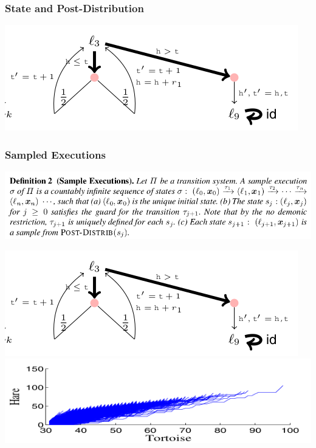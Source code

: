 \documentclass[11pt]{beamer}
\begin{document}
\begin{frame}\frametitle{State and Post-Distribution}

\begin{center}
\includegraphics[scale=0.4]{def1exp.png}
\end{center}

\end{frame}

\begin{frame}\frametitle{Sampled Executions}
\begin{center}
\includegraphics[scale=0.35]{def2.png}
\end{center}
\begin{example}

\begin{center}
\includegraphics[scale=0.3]{def1exp.png}\includegraphics[scale=0.3]{def2exp.png}
\end{center}

\end{example}




\end{frame}
\end{document}
